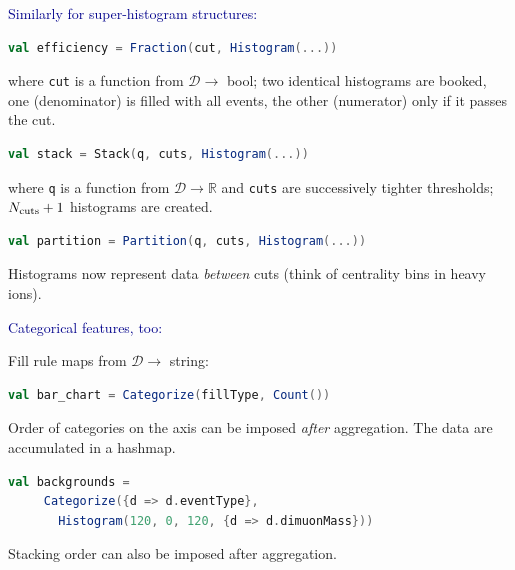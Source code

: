 \documentclass{beamer}
\begin{document}
\begin{frame}[fragile]{}
\textcolor{darkblue}{\large Similarly for super-histogram structures:}

\vspace{0.5 cm}
\begin{lstlisting}[language=scala]
val efficiency = Fraction(cut, Histogram(...))
\end{lstlisting}
where {\tt \small cut} is a function from $\mathcal{D} \to$ bool; two identical histograms are booked, one (denominator) is filled with all events, the other (numerator) only if it passes the cut.

\vfill
\begin{lstlisting}[language=scala]
val stack = Stack(q, cuts, Histogram(...))
\end{lstlisting}
where {\tt \small q} is a function from $\mathcal{D} \to \mathbb{R}$ and {\tt \small cuts} are successively tighter thresholds; $N_{\mbox{\scriptsize cuts}} + 1$ histograms are created.

\vfill
\begin{lstlisting}[language=scala]
val partition = Partition(q, cuts, Histogram(...))
\end{lstlisting}
Histograms now represent data {\it between} cuts (think of centrality bins in heavy ions).
\end{frame}

\begin{frame}[fragile]{}
\textcolor{darkblue}{\large Categorical features, too:}

\vfill
Fill rule maps from $\mathcal{D} \to$ string:
\begin{lstlisting}[language=scala]
val bar_chart = Categorize(fillType, Count())
\end{lstlisting}
Order of categories on the axis can be imposed {\it after} aggregation. The data are accumulated in a hashmap.

\vfill
\begin{lstlisting}[language=scala]
val backgrounds =
     Categorize({d => d.eventType},
       Histogram(120, 0, 120, {d => d.dimuonMass}))
\end{lstlisting}

Stacking order can also be imposed after aggregation.
\end{frame}
\end{document}
